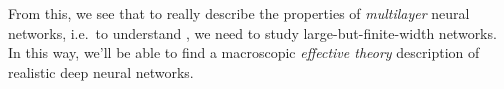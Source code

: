 From this, we see that to really describe the properties of \emph{multilayer} neural networks, i.e.~to understand , we need to study large-but-finite-width networks. In this way, we'll be able to find a macroscopic \emph{effective theory} description of realistic deep neural networks.




























 


























